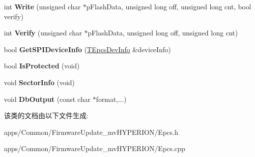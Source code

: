 \begin{DoxyCompactItemize}
\item 
\hypertarget{class_c_epcs_a457ad01b6037e50c56ffc01bfbc34d6d}{int {\bfseries Write} (unsigned char $\ast$p\+Flash\+Data, unsigned long off, unsigned long cnt, bool verify)}\label{class_c_epcs_a457ad01b6037e50c56ffc01bfbc34d6d}

\item 
\hypertarget{class_c_epcs_a5d6bde36a176831cb468c00d7db3524d}{int {\bfseries Verify} (unsigned char $\ast$p\+Flash\+Data, unsigned long off, unsigned long cnt)}\label{class_c_epcs_a5d6bde36a176831cb468c00d7db3524d}

\item 
\hypertarget{class_c_epcs_a764d29cb619ec744cab587b6d7d66386}{bool {\bfseries Get\+S\+P\+I\+Device\+Info} (\hyperlink{struct_s_epcs_dev_info}{T\+Epcs\+Dev\+Info} \&device\+Info)}\label{class_c_epcs_a764d29cb619ec744cab587b6d7d66386}

\item 
\hypertarget{class_c_epcs_a0d8abefcb93a9fa3b743b8a0e7bd47b6}{bool {\bfseries Is\+Protected} (void)}\label{class_c_epcs_a0d8abefcb93a9fa3b743b8a0e7bd47b6}

\item 
\hypertarget{class_c_epcs_af6bd38c287de8f4521a7de031b1539e8}{void {\bfseries Sector\+Info} (void)}\label{class_c_epcs_af6bd38c287de8f4521a7de031b1539e8}

\item 
\hypertarget{class_c_epcs_a07e00eced4de27d8971ba4b92dd8d8b4}{void {\bfseries Db\+Output} (const char $\ast$format,...)}\label{class_c_epcs_a07e00eced4de27d8971ba4b92dd8d8b4}

\end{DoxyCompactItemize}


该类的文档由以下文件生成\+:\begin{DoxyCompactItemize}
\item 
apps/\+Common/\+Firmware\+Update\+\_\+mv\+H\+Y\+P\+E\+R\+I\+O\+N/Epcs.\+h\item 
apps/\+Common/\+Firmware\+Update\+\_\+mv\+H\+Y\+P\+E\+R\+I\+O\+N/Epcs.\+cpp\end{DoxyCompactItemize}

